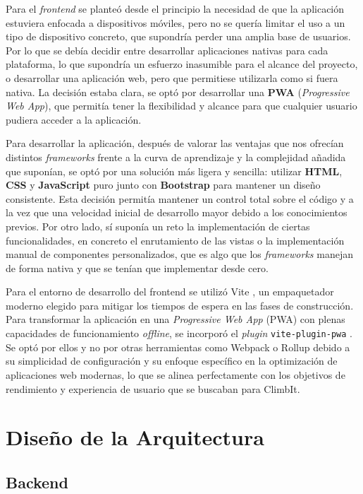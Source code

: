 Para el \textit{frontend} se planteó desde el principio la necesidad de que la aplicación estuviera enfocada a dispositivos móviles, pero no se quería limitar el uso a un tipo de dispositivo concreto, que supondría perder una amplia base de usuarios. Por lo que se debía decidir entre desarrollar aplicaciones nativas para cada plataforma, lo que supondría un esfuerzo inasumible para el alcance del proyecto, o desarrollar una aplicación web, pero que permitiese utilizarla como si fuera nativa. La decisión estaba clara, se optó por desarrollar una \textbf{PWA} (\textit{Progressive Web App}), que permitía tener la flexibilidad y alcance para que cualquier usuario pudiera acceder a la aplicación.

Para desarrollar la aplicación, después de valorar las ventajas que nos ofrecían distintos \textit{frameworks} frente a la curva de aprendizaje y la complejidad añadida que suponían, se optó por una solución más ligera y sencilla: utilizar \textbf{HTML}, \textbf{CSS} y \textbf{JavaScript} puro junto con \textbf{Bootstrap} para mantener un diseño consistente. Esta decisión permitía mantener un control total sobre el código y a la vez que una velocidad inicial de desarrollo  mayor debido a los conocimientos previos. Por otro lado, sí suponía un reto la implementación de ciertas funcionalidades, en concreto el enrutamiento de las vistas o la implementación manual de componentes personalizados, que es algo que los \textit{frameworks} manejan de forma nativa y que se tenían que implementar desde cero. 

Para el entorno de desarrollo del frontend se utilizó Vite \citep{vite_tool}, un empaquetador moderno elegido para mitigar los tiempos de espera en las fases de construcción. Para transformar la aplicación en una \textit{Progressive Web App} (PWA) con plenas capacidades de funcionamiento \textit{offline}, se incorporó el \textit{plugin} \texttt{vite-plugin-pwa} \citep{vite_plugin_pwa}. Se optó por ellos y no por otras herramientas como Webpack o Rollup debido a su simplicidad de configuración y su enfoque específico en la optimización de aplicaciones web modernas, lo que se alinea perfectamente con los objetivos de rendimiento y experiencia de usuario que se buscaban para ClimbIt.

\section{Diseño de la Arquitectura}

\subsection{Backend}

